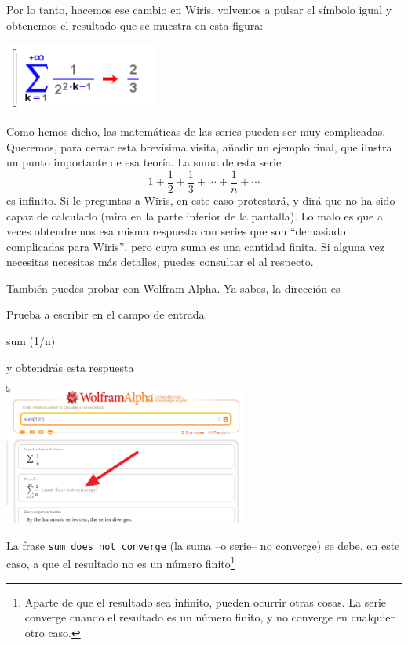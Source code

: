 \documentclass[10pt,a4paper]{article}\usepackage[]{graphicx}\usepackage[]{color}
\begin{document}
     Por lo tanto, hacemos ese cambio en Wiris, volvemos a pulsar el símbolo igual y obtenemos el resultado que se muestra en esta figura:
     \begin{center}
\includegraphics[width=5cm]{./fig/Tut05-05.png}
\end{center}

Como hemos dicho, las matemáticas de las series pueden ser muy complicadas. Queremos, para cerrar esta brevísima visita, añadir un ejemplo final, que ilustra un punto importante de esa teoría. La suma de esta serie
\[1+\dfrac{1}{2}+\dfrac{1}{3}+\cdots+\dfrac{1}{n}+\cdots\]
es infinito. Si le preguntas a Wiris, en este caso protestará, y dirá que no ha sido capaz de calcularlo (mira en la parte inferior de la pantalla). Lo malo es que a veces obtendremos esa misma respuesta con series que son ``demasiado complicadas para Wiris'', pero cuya suma es una cantidad finita. Si alguna vez necesitas necesitas más detalles, puedes consultar el
 al respecto.
      
      También  puedes probar con Wolfram Alpha. Ya sabes, la dirección es
      
      \begin{center}
      \end{center}
      
      Prueba a escribir en el campo de entrada
      \begin{center}
      \begin{minipage}{12cm}
      sum (1/n)
      \end{minipage}
      \end{center}
      
      y obtendrás esta respuesta
      \begin{center}
      \includegraphics[width=8cm]{./fig/Tut05-06.png}
      \end{center}
      La frase {\tt sum does not converge} (la suma --o serie-- no converge) se debe, en este caso, a que el resultado no es un número finito\footnote{Aparte de que el resultado sea infinito,  pueden ocurrir otras cosas. La serie converge cuando el resultado es un número finito, y no converge en cualquier otro caso.}
      
\end{document}
